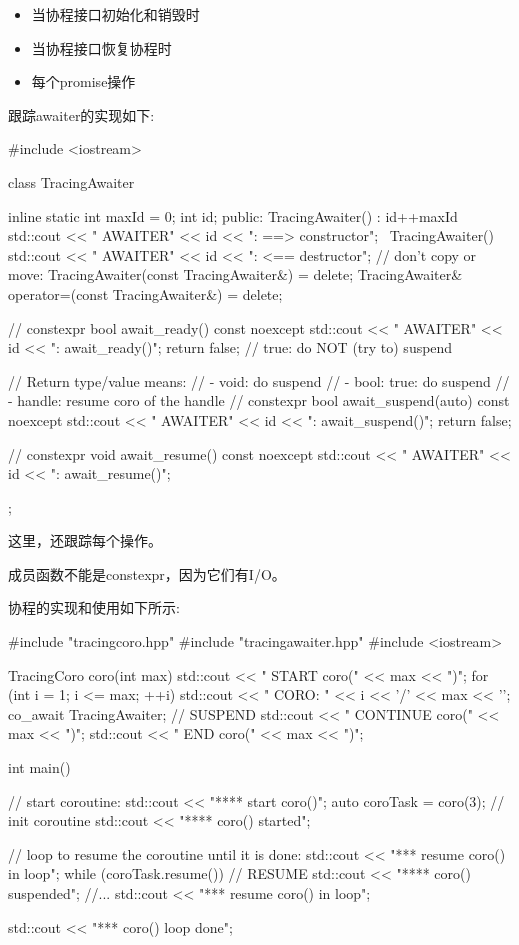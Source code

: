 \begin{itemize}
\item
当协程接口初始化和销毁时

\item
当协程接口恢复协程时

\item
每个promise操作
\end{itemize}

跟踪awaiter的实现如下:


\begin{cpp}
#include <iostream>

class TracingAwaiter {
	inline static int maxId = 0;
	int id;
	public:
	TracingAwaiter() : id{++maxId} {
		std::cout << " AWAITER" << id << ": ==> constructor\n";
	}
	~TracingAwaiter() {
		std::cout << " AWAITER" << id << ": <== destructor\n";
	}
	// don’t copy or move:
	TracingAwaiter(const TracingAwaiter&) = delete;
	TracingAwaiter& operator=(const TracingAwaiter&) = delete;

	// constexpr
	bool await_ready() const noexcept {
		std::cout << " AWAITER" << id << ": await_ready()\n";
		return false; // true: do NOT (try to) suspend
	}

	// Return type/value means:
	// - void: do suspend
	// - bool: true: do suspend
	// - handle: resume coro of the handle
	// constexpr
	bool await_suspend(auto) const noexcept {
		std::cout << " AWAITER" << id << ": await_suspend()\n";
		return false;
	}

	// constexpr
	void await_resume() const noexcept {
		std::cout << " AWAITER" << id << ": await_resume()\n";
	}
};
\end{cpp}

这里，还跟踪每个操作。

成员函数不能是constexpr，因为它们有I/O。

协程的实现和使用如下所示:


\begin{cpp}
#include "tracingcoro.hpp"
#include "tracingawaiter.hpp"
#include <iostream>

TracingCoro coro(int max)
{
	std::cout << " START coro(" << max << ")\n";
	for (int i = 1; i <= max; ++i) {
		std::cout << "  CORO: " << i << '/' << max << '\n';
		co_await TracingAwaiter{}; // SUSPEND
		std::cout << "   CONTINUE coro(" << max << ")\n";
	}
	std::cout << "  END coro(" << max << ")\n";
}

int main()
{
	// start coroutine:
	std::cout << "**** start coro()\n";
	auto coroTask = coro(3); // init coroutine
	std::cout << "**** coro() started\n";

	// loop to resume the coroutine until it is done:
	std::cout << "\n**** resume coro() in loop\n";
	while (coroTask.resume()) { // RESUME
		std::cout << "**** coro() suspended\n";
		//...
		std::cout << "\n**** resume coro() in loop\n";
	}

	std::cout << "\n**** coro() loop done\n";
}
\end{cpp}

